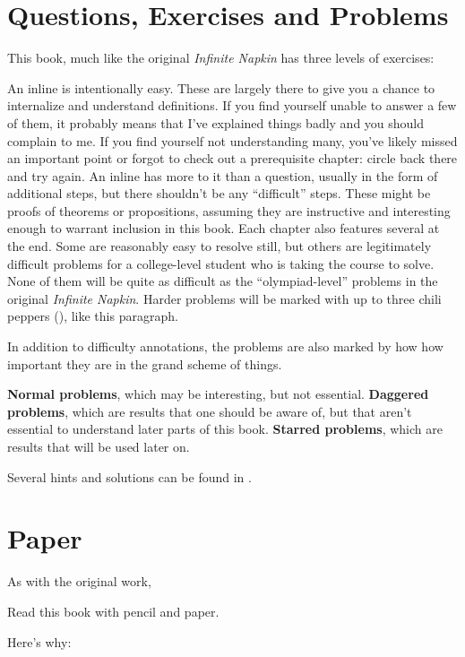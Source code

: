 \section{Questions, Exercises and Problems}
This book, much like the original \emph{Infinite Napkin\cite{ref:napkin}} has
three levels of exercises:
\begin{itemize}
  \ii{} An inline  is intentionally easy. These are largely
        there to give you a chance to internalize and understand definitions.
        If you find yourself unable to answer a few of them, it probably means
        that I've explained things badly and you should complain to me.
        If you find yourself not understanding many, you've likely missed an
        important point or forgot to check out a prerequisite chapter: circle
        back there and try again.
  \ii{} An inline  has more to it than a question, usually in
        the form of additional steps, but there shouldn't be any ``difficult''
        steps.
        These might be proofs of theorems or propositions, assuming they are
        instructive and interesting enough to warrant inclusion in this book.
  \ii{} Each chapter also features several  at the end.
        Some are reasonably easy to resolve still, but others are legitimately
        difficult problems for a college-level student who is taking the course
        to solve. None of them will be quite as difficult as the
        ``olympiad-level'' problems in the original \emph{Infinite
        Napkin\cite{ref:napkin}}.
        \onechili{} Harder problems will be marked with up to three chili peppers
        (\scalebox{0.7}{\chili}), like this paragraph.

        In addition to difficulty annotations, the problems are also marked by
        how how important they are in the grand scheme of things.
        \begin{itemize}
          \ii{}\textbf{Normal problems},
          which may be interesting, but not essential.
          \ii{}\textbf{Daggered problems},
          which are results that one should be aware of, but that aren't
          essential to understand later parts of this book.
          \ii{}\textbf{Starred problems},
          which are results that will be used later on.
        \end{itemize}
\end{itemize}
Several hints and solutions can be found in .

\section{Paper}
As with the original work\cite{ref:napkin},
\begin{moral}
  Read this book with pencil and paper.
\end{moral}
Here's why:

